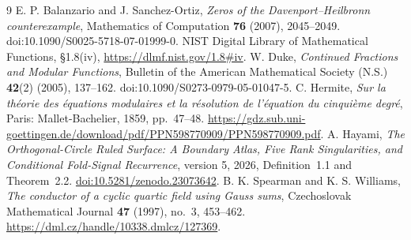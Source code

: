 \documentclass[11pt]{article}
\begin{document}
\begin{thebibliography}{9}
 E. P. Balanzario and J. Sanchez-Ortiz, \emph{Zeros of the Davenport--Heilbronn counterexample}, Mathematics of Computation \textbf{76} (2007), 2045--2049. doi:10.1090/S0025-5718-07-01999-0.
 NIST Digital Library of Mathematical Functions, \S1.8(iv), \url{https://dlmf.nist.gov/1.8#iv}.
 W. Duke, \emph{Continued Fractions and Modular Functions}, Bulletin of the American Mathematical Society (N.S.) \textbf{42}(2) (2005), 137--162. doi:10.1090/S0273-0979-05-01047-5.
 C. Hermite, \emph{Sur la th\'eorie des \'equations modulaires et la r\'esolution de l'\'equation du cinqui\`eme degr\'e}, Paris: Mallet-Bachelier, 1859, pp.~47--48. \url{https://gdz.sub.uni-goettingen.de/download/pdf/PPN598770909/PPN598770909.pdf}.
 A. Hayami, \emph{The Orthogonal-Circle Ruled Surface: A Boundary Atlas, Five Rank Singularities, and Conditional Fold-Signal Recurrence}, version 5, 2026, Definition~1.1 and Theorem~2.2. \href{https://doi.org/10.5281/zenodo.23073642}{doi:10.5281/zenodo.23073642}.
 B. K. Spearman and K. S. Williams, \emph{The conductor of a cyclic quartic field using Gauss sums}, Czechoslovak Mathematical Journal \textbf{47} (1997), no.~3, 453--462. \url{https://dml.cz/handle/10338.dmlcz/127369}.
\end{thebibliography}
\end{document}
